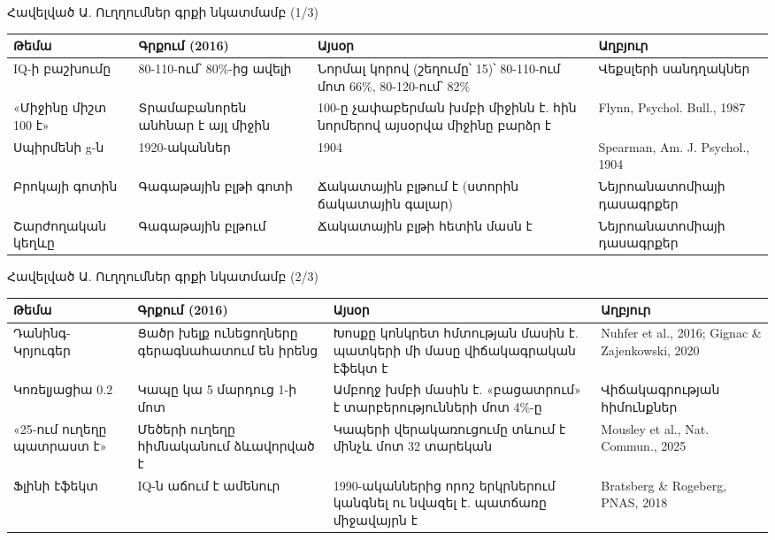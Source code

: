 \appendix
{}\gdef{}\gdef{}

\begin{frame}{Հավելված Ա. Ուղղումներ գրքի նկատմամբ (1/3)}
  \footnotesize
  \setlength{\tabcolsep}{4pt}
  \renewcommand{\arraystretch}{1.22}
  \begin{tabular}{@{}L{2.6cm}L{3.2cm}L{4.5cm}L{3.2cm}@{}}
    \toprule
    \textbf{Թեմա} & \textbf{Գրքում (2016)} & \textbf{Այսօր} & \textbf{Աղբյուր}\\
    \midrule
    IQ-ի բաշխումը & 80-110-ում՝ 80\%-ից ավելի & Նորմալ կորով (շեղումը՝ 15)՝ 80-110-ում մոտ 66\%, 80-120-ում՝ 82\% & Վեքսլերի սանդղակներ\\
    «Միջինը միշտ 100 է» & Տրամաբանորեն անհնար է այլ միջին & 100-ը չափաբերման խմբի միջինն է. հին նորմերով այսօրվա միջինը բարձր է & Flynn, Psychol. Bull., 1987\\
    Սպիրմենի g-ն & 1920-ականներ & 1904 & Spearman, Am. J. Psychol., 1904\\
    Բրոկայի գոտին & Գագաթային բլթի գոտի & Ճակատային բլթում է (ստորին ճակատային գալար) & Նեյրոանատոմիայի դասագրքեր\\
    Շարժողական կեղևը & Գագաթային բլթում & Ճակատային բլթի հետին մասն է & Նեյրոանատոմիայի դասագրքեր\\
    \bottomrule
  \end{tabular}
\end{frame}

\begin{frame}{Հավելված Ա. Ուղղումներ գրքի նկատմամբ (2/3)}
  \footnotesize
  \setlength{\tabcolsep}{4pt}
  \renewcommand{\arraystretch}{1.22}
  \begin{tabular}{@{}L{2.6cm}L{3.2cm}L{4.5cm}L{3.2cm}@{}}
    \toprule
    \textbf{Թեմա} & \textbf{Գրքում (2016)} & \textbf{Այսօր} & \textbf{Աղբյուր}\\
    \midrule
    Դանինգ-Կրյուգեր & Ցածր խելք ունեցողները գերագնահատում են իրենց & Խոսքը կոնկրետ հմտության մասին է. պատկերի մի մասը վիճակագրական էֆեկտ է & Nuhfer et al., 2016; Gignac \& Zajenkowski, 2020\\
    Կոռելյացիա 0.2 & Կապը կա 5 մարդուց 1-ի մոտ & Ամբողջ խմբի մասին է. «բացատրում» է տարբերությունների մոտ 4\%-ը & Վիճակագրության հիմունքներ\\
    «25-ում ուղեղը պատրաստ է» & Մեծերի ուղեղը հիմնականում ձևավորված է & Կապերի վերակառուցումը տևում է մինչև մոտ 32 տարեկան & Mousley et al., Nat. Commun., 2025\\
    Ֆլինի էֆեկտ & IQ-ն աճում է ամենուր & 1990-ականներից որոշ երկրներում կանգնել ու նվազել է. պատճառը միջավայրն է & Bratsberg \& Rogeberg, PNAS, 2018\\
    \bottomrule
  \end{tabular}
\end{frame}

